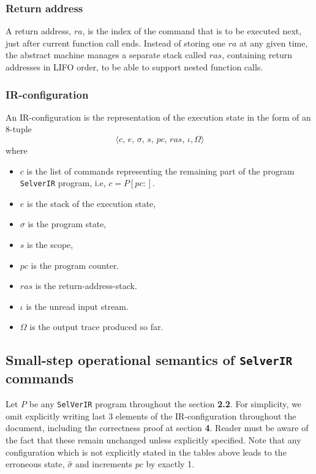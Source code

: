 \documentclass{article}
\begin{document}
\subsubsection{Return address}
A return address, $ra$, is the index of the command that is to be executed next, just after current function call ends. Instead of storing one $ra$ at any given time, the abstract machine manages a separate stack called $ras$, containing return addresses in LIFO order, to be able to support nested function calls.

\subsubsection{IR-configuration}
An IR-configuration is the representation of the execution state in the form of an 8-tuple 
\[
    \langle c,\, e,\, \sigma,\, s,\, pc,\, ras,\, \iota, \Omega \rangle
\] where
\begin{itemize}
    \item $c$ is the list of commands representing the remaining part of the program \texttt{SelverIR} program, i.e, $c = P[pc:]$.

    \item $e$ is the stack of the execution state,

    \item $\sigma$ is the program state,

    \item $s$ is the scope,

    \item $pc$ is the program counter.

    \item $ras$ is the return-address-stack.

    \item $\iota$ is the unread input stream.

    \item $\Omega$ is the output trace produced so far.
    
\end{itemize}

\newpage
\subsection{Small-step operational semantics of \texttt{SelverIR} commands}
Let $P$ be any \texttt{SelVerIR} program throughout the section \textbf{2.2}. For simplicity, we omit explicitly writing last 3 elements of the IR-configuration throughout the document, including the correctness proof at section \textbf{4}. Reader must be aware of the fact that these remain unchanged unless explicitly specified. Note that any configuration which is not explicitly stated in the tables above leads to the erroneous state, $\hat{\sigma}$ and increments $pc$ by exactly 1.
\end{document}
